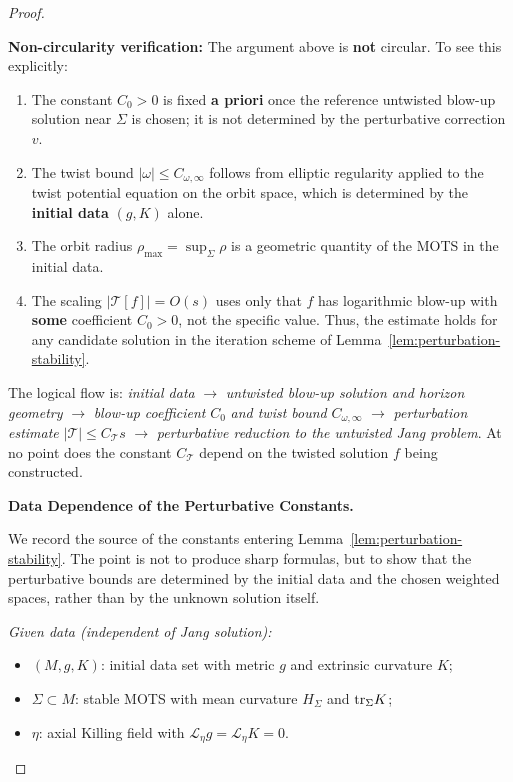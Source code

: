 \begin{proof}
\begin{lemma}
\textbf{Non-circularity verification:} The argument above is \textbf{not} circular. To see this explicitly:
\begin{enumerate}[label=\textup{(NC\arabic*)}]
    \item The constant $C_0 > 0$ is fixed \textbf{a priori} once the reference untwisted blow-up solution near $\Sigma$ is chosen; it is not determined by the perturbative correction $v$.
    \item The twist bound $|\omega| \leq C_{\omega,\infty}$ follows from elliptic regularity applied to the twist potential equation on the orbit space, which is determined by the \textbf{initial data} $(g, K)$ alone.
    \item The orbit radius $\rho_{\max} = \sup_\Sigma \rho$ is a geometric quantity of the MOTS in the initial data.
    \item The scaling $|\mathcal{T}[f]| = O(s)$ uses only that $f$ has logarithmic blow-up with \textbf{some} coefficient $C_0 > 0$, not the specific value. Thus, the estimate holds for any candidate solution in the iteration scheme of Lemma~\ref{lem:perturbation-stability}.
\end{enumerate}
The logical flow is: \textit{initial data} $\to$ \textit{untwisted blow-up solution and horizon geometry} $\to$ \textit{blow-up coefficient} $C_0$ \textit{and twist bound} $C_{\omega,\infty}$ $\to$ \textit{perturbation estimate} $|\mathcal{T}| \leq C_\mathcal{T} s$ $\to$ \textit{perturbative reduction to the untwisted Jang problem}. At no point does the constant $C_\mathcal{T}$ depend on the twisted solution $f$ being constructed.

\textbf{Data Dependence of the Perturbative Constants.}

We record the source of the constants entering Lemma~\ref{lem:perturbation-stability}. The point is not to produce sharp formulas, but to show that the perturbative bounds are determined by the initial data and the chosen weighted spaces, rather than by the unknown solution itself.

\textit{Given data (independent of Jang solution):}
\begin{itemize}
    \item $(M, g, K)$: initial data set with metric $g$ and extrinsic curvature $K$;
    \item $\Sigma \subset M$: stable MOTS with mean curvature $H_\Sigma$ and $\mathrm{tr}_\Sigma K$;
    \item $\eta$: axial Killing field with $\mathcal{L}_\eta g = \mathcal{L}_\eta K = 0$.
\end{itemize}


\end{lemma}
\end{proof}
